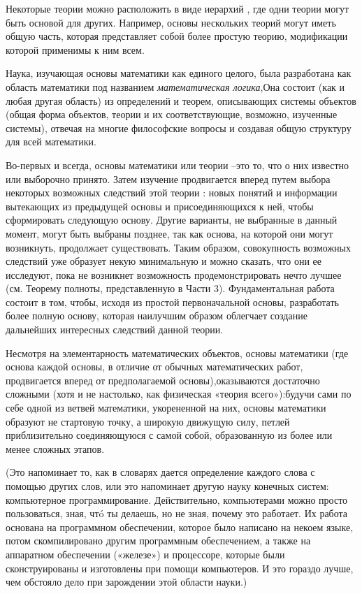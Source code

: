 Некоторые теории можно расположить в виде иерархий , где одни теории могут быть основой для других. Например, основы нескольких теорий могут иметь общую часть, которая представляет собой более простую теорию, модификации которой применимы к ним всем. 

Наука, изучающая основы математики как единого целого, была разработана как область математики под названием  {\it математическая логика},Она состоит (как и любая другая область) из определений и теорем, описывающих системы объектов (общая форма объектов, теории и их соответствующие, возможно, изученные системы), отвечая на многие философские вопросы и создавая общую структуру для всей математики. 

Во-первых и всегда, основы математики или теории –это то, что о них известно или выборочно принято. Затем изучение продвигается вперед путем выбора некоторых возможных следствий этой теории : новых понятий и информации вытекающих из предыдущей основы и присоединяющихся к ней, чтобы сформировать следующую основу. Другие варианты, не выбранные в данный момент, могут быть выбраны позднее, так как основа, на которой они могут возникнуть, продолжает существовать.  Таким образом, совокупность возможных следствий уже образует некую минимальную   и можно сказать, что они ее исследуют, пока не возникнет возможность продемонстрировать нечто лучшее (см. Теорему полноты, представленную в Части 3). 
Фундаментальная работа состоит в том, чтобы, исходя из простой первоначальной основы, разработать более полную основу, которая наилучшим образом облегчает создание дальнейших интересных следствий данной теории. 

Несмотря на элементарность математических объектов, основы математики  (где основа каждой основы, в отличие от обычных математических работ, продвигается вперед от предполагаемой основы),оказываются достаточно сложными (хотя и не настолько, как физическая «теория всего»):будучи сами по себе одной из ветвей математики, укорененной на них, основы математики образуют не стартовую точку, а широкую движущую силу, петлей приблизительно соединяющуюся с самой собой, образованную из более или менее сложных этапов.  
 
(Это напоминает то, как в словарях дается определение каждого слова с помощью других слов, или это напоминает другую науку конечных систем: компьютерное программирование. Действительно, компьютерами можно просто пользоваться, зная, чтó ты делаешь, но не зная, почему это работает.  Их работа основана на программном обеспечении, которое было написано на некоем языке, потом скомпилировано другим программным обеспечением, а также на аппаратном обеспечении («железе») и процессоре, которые были сконструированы и изготовлены при помощи компьютеров. И это гораздо лучше, чем обстояло дело при зарождении этой области науки.)
 
